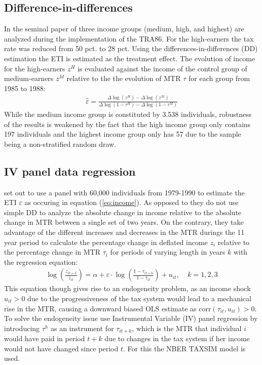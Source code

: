 \label{sec:empirics}
\subsection{Difference-in-differences}
In the seminal paper of \citet{feldstein1995effect} three income groups (medium, high, and highest) are analyzed during the implementation of the TRA86. For the high-earners the tax rate was reduced from 50 pct. to 28 pct. Using the differences-in-differences (DD) estimation the ETI is estimated as the treatment effect. The evolution of income for the high-earners $z^H$ is evaluated against the income of the control group of medium-earners $z^M$ relative to the the evolution of MTR $\tau$ for each group from 1985 to 1988:
\begin{align}
  \hat{\varepsilon}=\frac{\Delta \log(z^H) - \Delta \log(z^M)}{\Delta \log(1-\tau^H) - \Delta \log(1-\tau^M)}
  \label{eq:DD}
\end{align}
While the medium income group is constituted by 3.538 individuals, robustness of the results is weakened by the fact that the high income group only contains 197 individuals and the highest income group only has 57 due to the sample being a non-stratified random draw.

\subsection{IV panel data regression}
\citet{gruber2002elasticity} set out to use a panel with 60,000 individuals from 1979-1990 to estimate the ETI $\varepsilon$ as occuring in equation (\ref{eq:income}). As opposed to \citet{feldstein1995effect} they do not use simple DD to analyze the absolute change in income relative to the absolute change in MTR between a single set of two years. On the contrary, they take advantage of the different increases and decreases in the MTR durings the 11 year period to calculate the percentage change in deflated income $z_i$ relative to the percentage change in MTR $\tau_i$ for periods of varying length in years $k$ with the regression equation:
\begin{align}
  \log\left(\frac{z_{it+k}}{z_{it}}\right)=\alpha +\varepsilon\cdot \log\left(\frac{1-\tau_{it+k}}{1-\tau_{it}}\right) + u_{it},\ \ \ \ \ k=1,2,3
  \label{eq:income_est}
\end{align}
This equation though gives rise to an endogeneity problem, as an income shock $u_{it}>0$ due to the progressiveness of the tax system would lead to a mechanical rise in the MTR, causing a downward biased OLS estimate as corr$(\tau_{it},u_{it})>0$. To solve the endogeneity issue \citet{gruber2002elasticity} use Instrumental Variable (IV) panel regression by introducing $\tau^h$ as an instrument for $\tau_{it+k}$, which is the MTR that individual $i$ would have paid in period $t+k$ due to changes in the tax system if her income would not have changed since period $t$. For this the NBER TAXSIM model is used.

